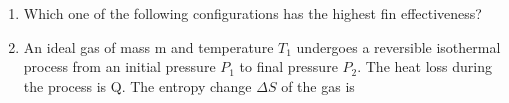 \documentclass[journal,11pt,onecolumn]{IEEEtran}
\begin{document}
\begin{enumerate}
          \begin{enumerate}
          \end{enumerate}

    \item Which one of the following configurations has the highest fin effectiveness?

          \begin{enumerate}
          \end{enumerate}

    \item An ideal gas of mass m and temperature \(T_1\) undergoes a reversible isothermal process from an initial pressure \(P_1\) to final pressure \(P_2\). The heat loss during the process is Q. The entropy change \(\Delta S\) of the gas is

          \begin{enumerate}
          \end{enumerate}


\end{enumerate}
\end{document}

